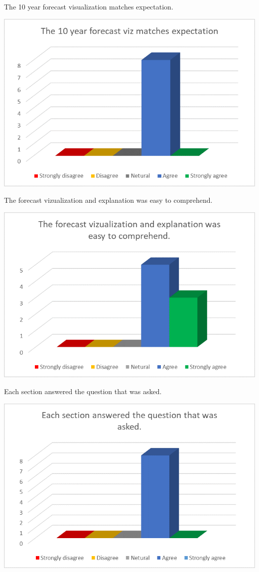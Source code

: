 \documentclass[]{article}
\begin{document}
The 10 year forecast visualization matches expectation.\\

\begin{center}\includegraphics[width=0.8\linewidth]{Ex2/figures/q10} \end{center}

The forecast vizualization and explanation was easy to comprehend.\\

\begin{center}\includegraphics[width=0.8\linewidth]{Ex2/figures/q11} \end{center}

Each section answered the question that was asked.\\

\begin{center}\includegraphics[width=0.8\linewidth]{Ex2/figures/q12} \end{center}
\end{document}
